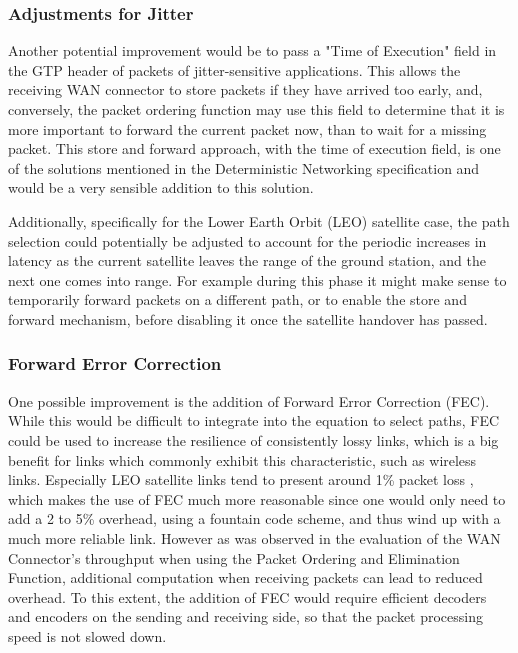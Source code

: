 \subsubsection{Adjustments for Jitter}

Another potential improvement would be to pass a "Time of Execution" field in the GTP header of packets of jitter-sensitive applications. This allows the receiving WAN connector to store packets if they have arrived too early, and, conversely, the packet ordering function may use this field to determine that it is more important to forward the current packet now, than to wait for a missing packet. This store and forward approach, with the time of execution field, is one of the solutions mentioned in the Deterministic Networking specification and would be a very sensible addition to this solution.

Additionally, specifically for the Lower Earth Orbit (LEO) satellite case, the path selection could potentially be adjusted to account for the periodic increases in latency as the current satellite leaves the range of the ground station, and the next one comes into range. For example during this phase it might make sense to temporarily forward packets on a different path, or to enable the store and forward mechanism, before disabling it once the satellite handover has passed.

\subsubsection{Forward Error Correction}

One possible improvement is the addition of Forward Error Correction (FEC). While this would be difficult to integrate into the equation to select paths, FEC could be used to increase the resilience of consistently lossy links, which is a big benefit for links which commonly exhibit this characteristic, such as wireless links. Especially LEO satellite links tend to present around 1\% packet loss \cite{deutschmann2022broadband}, which makes the use of FEC much more reasonable since one would only need to add a 2 to 5\% overhead, using a fountain code scheme, and thus wind up with a much more reliable link. However as was observed in the evaluation of the WAN Connector's throughput when using the Packet Ordering and Elimination Function, additional computation when receiving packets can lead to reduced overhead. To this extent, the addition of FEC would require efficient decoders and encoders on the sending and receiving side, so that the packet processing speed is not slowed down.

